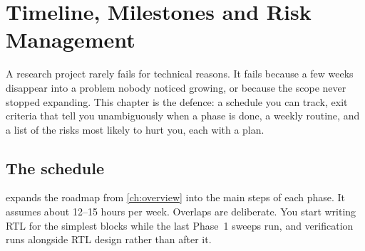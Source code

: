 \chapter{Timeline, Milestones and Risk Management}\label{ch:plan}

A research project rarely fails for technical reasons. It fails because a few
weeks disappear into a problem nobody noticed growing, or because the scope never
stopped expanding. This chapter is the defence: a schedule you can track, exit
criteria that tell you unambiguously when a phase is done, a weekly routine, and
a list of the risks most likely to hurt you, each with a plan.

\section{The schedule}\label{sec:plan:gantt}

 expands the roadmap from \cref{ch:overview} into the main
steps of each phase. It assumes about 12--15 hours per week. Overlaps are
deliberate. You start writing RTL for the simplest blocks while the last Phase~1
sweeps run, and verification runs alongside RTL design rather than after it.


